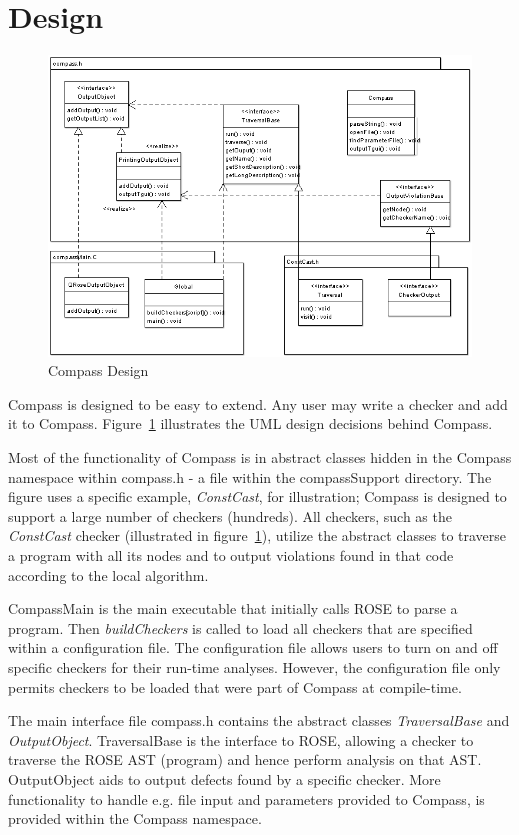 \section{Design}

\begin{figure}[thb]
\includegraphics[width=6.0in]{compassdesign.png}
\caption{Compass Design}
\label{CompassDesign}
\end{figure}

Compass is designed to be easy to extend. Any user may write a checker and add it to
Compass. Figure~\ref{CompassDesign} illustrates the UML design decisions behind Compass.


Most of the functionality of Compass is in abstract classes hidden in the Compass
namespace within compass.h - a file within the compassSupport directory. The figure uses a
specific example, {\em ConstCast}, for illustration; Compass is designed to support a large
number of checkers (hundreds). All checkers, such as the {\em ConstCast} checker (illustrated in
figure~\ref{CompassDesign}), utilize the abstract classes to traverse a program with all
its nodes and to output violations found in that code according to the local algorithm.

CompassMain is the main executable that initially calls ROSE to parse a program. Then
\emph{buildCheckers} is called to load all checkers that are specified within a
configuration file. The configuration file allows users to turn on and off specific
checkers for their run-time analyses. However, the configuration file only permits
checkers to be loaded that were part of Compass at compile-time.

The main interface file compass.h contains the abstract classes \emph{TraversalBase} and 
\emph{OutputObject}. TraversalBase is the interface to ROSE, allowing a checker to
traverse the ROSE AST (program) and hence perform analysis on that AST. OutputObject aids
to output defects found by a specific checker. More functionality to handle e.g. file
input and parameters provided to Compass, is provided within the Compass namespace.

